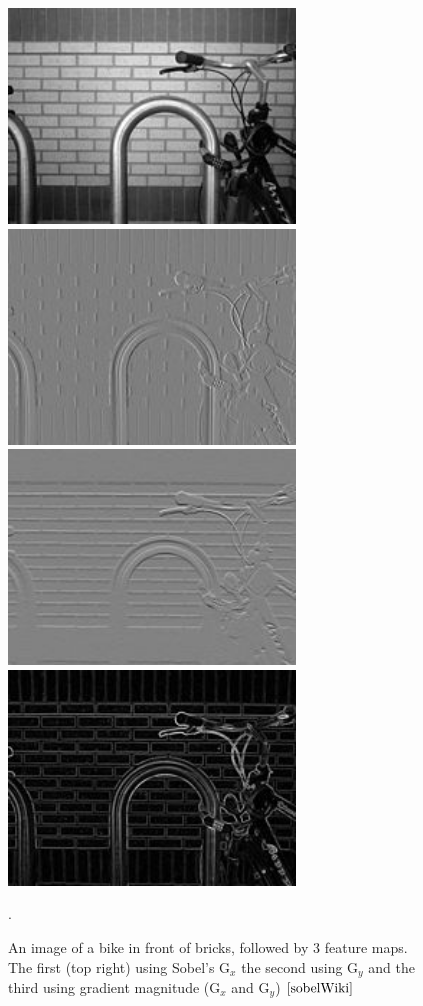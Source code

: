 \documentclass[12pt]{report} %
\begin{document}
\begin{figure}
\centering
\includegraphics[width=3in]{sobel_bike} 
\includegraphics[width=3in]{sobel_x} 
\includegraphics[width=3in]{sobel_y} 
\includegraphics[width=3in]{sobel_gradient} 
\caption[Sobel Filter Applied to Image]
	{An image of a bike in front of bricks, followed by 3 feature maps. The first (top right) using Sobel's G$_{x}$ the second using G$_{y}$ and the third using gradient magnitude (G$_{x}$ and G$_{y}$) $\cite{sobelWiki}$}.
\end{figure}	
	
\end{document}
